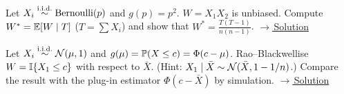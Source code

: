 \documentclass[main.tex]{subfiles}
\begin{document}
\begin{exercise}\label{exr:09-3}
Let $X_i\iid\text{Bernoulli}(p)$ and $g(p)=p^2$. $W=X_1X_2$ is unbiased. Compute $W^*=\E[W\mid T]$ ($T=\sum X_i$) and show that $W^*=\frac{T(T-1)}{n(n-1)}$.
\hfill\hyperref[coz:09-3]{\footnotesize$\rightarrow$\,Solution}
\end{exercise}

\begin{exercise}\label{exr:09-4}
Let $X_i\iid\Normal(\mu,1)$ and $g(\mu)=\P(X\le c)=\Phi(c-\mu)$. Rao--Blackwellise $W=\I\{X_1\le c\}$ with respect to $\bar X$. (Hint: $X_1\mid\bar X\sim\Normal(\bar X,1-1/n)$.) Compare the result with the plug-in estimator $\Phi(c-\bar X)$ by simulation.
\hfill\hyperref[coz:09-4]{\footnotesize$\rightarrow$\,Solution}
\end{exercise}

\end{document}
